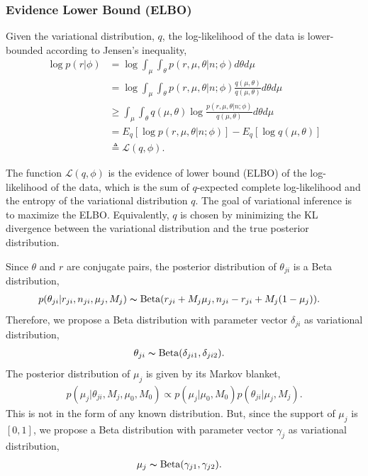 \documentclass{bmcart}
\begin{document}
\subsubsection{Evidence Lower Bound (ELBO)}
Given the variational distribution, $q$, the log-likelihood of the data is lower-bounded according to Jensen's inequality,
\begin{equation}
\begin{split}
\log p \left( r | \phi \right) &= \log \int_\mu \int_\theta p\left(r,\mu,\theta |n; \phi \right) d\theta d\mu \\
&= \log \int_\mu \int_\theta p\left(r,\mu,\theta |n; \phi \right)\frac{q\left(\mu,\theta \right) }{q\left(\mu,\theta \right) } d\theta d\mu \\
&\geq \int_\mu \int_\theta q\left(\mu,\theta \right) \log \frac{ p\left(r,\mu,\theta |n; \phi \right)}{q\left(\mu,\theta \right)} d\theta d\mu \\
&= E_q \left[ \log p\left(r,\mu,\theta |n; \phi \right)\right] - E_q \left[ \log q\left(\mu,\theta \right)\right] \\
&\triangleq \mathcal{L}(q, \phi).
\end{split}
\end{equation}

The function $\mathcal{L}(q, \phi)$ is the evidence of lower bound (ELBO) of the log-likelihood of the data, which is the sum of $q$-expected complete log-likelihood and the entropy of the variational distribution $q$.
The goal of variational inference is to maximize the ELBO.
Equivalently, $q$ is chosen by minimizing the KL divergence between the variational distribution and the true posterior distribution.

Since $\theta$ and $r$ are conjugate pairs, the posterior distribution of $\theta_{ji}$ is a Beta distribution,
\begin{align}
&p(\theta_{ji}|r_{ji},n_{ji},\mu_j,M_j)
\thicksim \text{Beta}(r_{ji}+M_j \mu_j, n_{ji}-r_{ji}+M_j(1-\mu_j)).
\end{align}
Therefore, we propose a Beta distribution with parameter vector $\delta_{ji}$ as variational distribution,
\begin{align}
\theta_{ji} &\thicksim \text{Beta}(\delta_{ji1}, \delta_{ji2}) \nonumber.
\end{align}
%
The posterior distribution of $\mu_j$ is given by its Markov blanket,
\begin{align}
p(\mu_j|\theta_{ji},M_j,\mu_0,M_0)\propto p(\mu_j|\mu_0,M_0)p(\theta_{ji}|\mu_j,M_j).
\end{align}
This is not in the form of any known distribution.
But, since the support of $\mu_j$ is $[0,1]$, we propose a Beta distribution with parameter vector $\gamma_{j}$ as variational distribution,
\begin{align}
\mu_j &\thicksim \text{Beta}(\gamma_{j1}, \gamma_{j2}) \nonumber.
\end{align}
\end{document}
